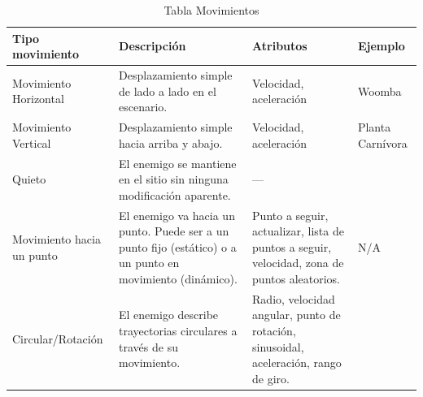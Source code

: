 \begin{table}[!h]
	\centering
	\begin{tabular}{|p{3cm}|p{4.5cm}|p{4cm}|p{3cm}|}
	\hline
	\textbf{Tipo movimiento} & \textbf{Descripción} & \textbf{Atributos} & \textbf{Ejemplo} \\ 
	\hline
	Movimiento Horizontal & Desplazamiento simple de lado a lado en el escenario. & Velocidad, aceleración & Woomba \\ 
	\hline
	Movimiento Vertical & Desplazamiento simple hacia arriba y abajo. & Velocidad, aceleración & Planta Carnívora \\ 
	\hline
	Quieto & El enemigo se mantiene en el sitio sin ninguna modificación aparente. & —  \\ 
	\hline
	Movimiento hacia un punto & El enemigo va hacia un punto. Puede ser a un punto fijo (estático) o a un punto en movimiento (dinámico). & Punto a seguir, actualizar, lista de puntos a seguir, velocidad, zona de puntos aleatorios. & N/A \\ 
	\hline
	Circular/Rotación & El enemigo describe trayectorias circulares a través de su movimiento. & Radio, velocidad angular, punto de rotación, sinusoidal, aceleración, rango de giro.  \\ 
	\hline
	\end{tabular}
	\caption{Tabla Movimientos}
	\label{tab:movimientos}
\end{table}

\begin{table}[h]
    \centering

    \renewcommand{\arraystretch}{1.5}
    \setlength{\tabcolsep}{4pt} %
    \caption{Matriz de compatibilidad de movimientos}
\end{table}


